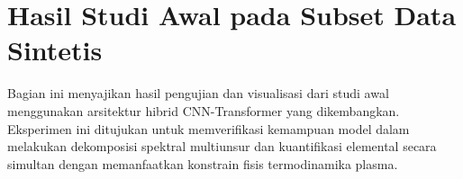 



\chapter{Hasil Studi Awal pada Subset Data Sintetis}
\label{app:studi-awal}

Bagian ini menyajikan hasil pengujian dan visualisasi dari studi awal menggunakan arsitektur hibrid CNN-Transformer yang dikembangkan. Eksperimen ini ditujukan untuk memverifikasi kemampuan model dalam melakukan dekomposisi spektral multiunsur dan kuantifikasi elemental secara simultan dengan memanfaatkan konstrain fisis termodinamika plasma.


